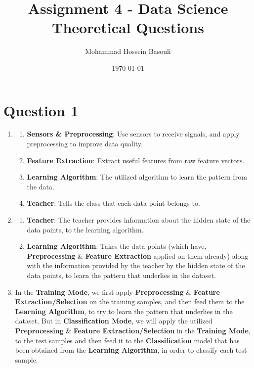 \documentclass[a4paper,12pt]{article}
\begin{document}
\title{Assignment 4 - Data Science \\
Theoretical Questions}
\author{Mohammad Hossein Basouli}
\date{\today}
\maketitle

\section*{Question 1}

\begin{enumerate}[label=(\alph*)]
    \item 
    \begin{enumerate}[label=\arabic*.]
        \item \textbf{Sensors \& Preprocessing}: Use sensors to receive signals, and apply preprocessing to improve data quality.
        \item \textbf{Feature Extraction}: Extract useful features from raw feature vectors. 
        \item \textbf{Learning Algorithm}: The utilized algorithm to learn the pattern from the data.
        \item \textbf{Teacher}: Tells the class that each data point belongs to.
    \end{enumerate}
    \item 
    \begin{enumerate}[label=\arabic*.]
        \item \textbf{Teacher}: The teacher provides information about the hidden state of the data points, to the learning algorithm.
        \item \textbf{Learning Algorithm}: Takes the data points (which have, \textbf{Preprocessing} \& \textbf{Feature Extraction} applied on them already) along with the information provided by the teacher by the hidden state of the data points, to learn the pattern that underlies in the dataset.
    \end{enumerate}
    \item In the \textbf{Training Mode}, we first apply \textbf{Preprocessing} \& \textbf{Feature Extraction/Selection} on the training samples, and then feed them to the \textbf{Learning Algorithm}, to try to learn the pattern that underlies in the dataset. But in \textbf{Classification Mode}, we will apply the utilized \textbf{Preprocessing} \& \textbf{Feature Extraction/Selection} in the \textbf{Training Mode}, to the test samples and then feed it to the \textbf{Classification} model that has been obtained from the \textbf{Learning Algorithm}, in order to classify each test sample.
\end{enumerate}
\end{document}
